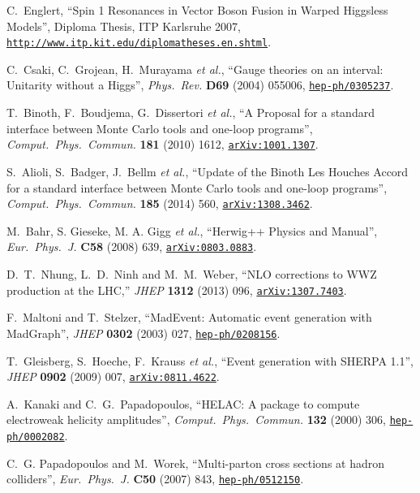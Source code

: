 \documentclass[english,12pt]{article}
\begin{document}
\begin{thebibliography}{10}
C.~Englert, ``Spin 1 Resonances in Vector Boson Fusion in Warped Higgsless
  Models'', {Diploma Thesis, ITP Karlsruhe 2007}, {\href{http://www.itp.kit.edu/diplomatheses.en.shtml}{\tt http://www.itp.kit.edu/diplomatheses.en.shtml}}.

C.~Csaki, C.~Grojean, H.~Murayama {\it et al.}, ``{Gauge theories
  on an interval: Unitarity without a Higgs}'', {\em Phys.\ Rev.} {\bf D69}
  (2004) 055006,
\href{http://www.arXiv.org/abs/hep-ph/0305237}{{\tt hep-ph/0305237}}.

  T.~Binoth, F.~Boudjema, G.~Dissertori {\it et al.},
  ``{A Proposal for a standard interface between Monte Carlo tools and one-loop programs}'',
  {\em Comput.\ Phys.\ Commun.}  {\bf 181} (2010) 1612,
  \href{http://arxiv.org/abs/1001.1307}{{\tt arXiv:1001.1307}}.

  S.~Alioli, S.~Badger, J.~Bellm {\it et al.},
  ``{Update of the Binoth Les Houches Accord for a standard interface between Monte Carlo tools and one-loop programs}'',
  {\em Comput.\ Phys.\ Commun.}  {\bf 185} (2014) 560,
  \href{http://arxiv.org/abs/1308.3462}{{\tt arXiv:1308.3462}}.

M.~Bahr, S. Gieseke, M. A. Gigg {\it et al.}, ``{Herwig++ Physics and Manual}'', {\em Eur.\ Phys.\ J.} 
{\bf C58} (2008) 639, 
\href{http://www.arXiv.org/abs/0803.0883}{{\tt arXiv:0803.0883}}.

  D.~T.~Nhung, L.~D.~Ninh and M.~M.~Weber,
  ``NLO corrections to WWZ production at the LHC,''
  {\em JHEP } {\bf 1312} (2013) 096,
\href{http://www.arXiv.org/abs/1307.7403}{{\tt arXiv:1307.7403}}.

F.~Maltoni and T.~Stelzer, ``{MadEvent: Automatic event generation with
  MadGraph}'', {\em JHEP} {\bf 0302} (2003) 027,
\href{http://www.arXiv.org/abs/hep-ph/0208156}{{\tt hep-ph/0208156}}.

  T.~Gleisberg, S.~Hoeche, F.~Krauss {\it et al.},
  ``{Event generation with SHERPA 1.1}'',
  {\em JHEP} {\bf 0902} (2009)  007,
\href{http://www.arXiv.org/abs/0811.4622}{{\tt arXiv:0811.4622}}.

A.~Kanaki and C.~G.~Papadopoulos, 
``{HELAC: A package to compute electroweak helicity amplitudes}'',
{\em Comput.\ Phys.\ Commun.} {\bf 132} (2000) 306,
\href{http://www.arXiv.org/abs/hep-ph/0002082}{{\tt hep-ph/0002082}}.

C.~G. Papadopoulos and M.~Worek, ``{Multi-parton cross sections at hadron
  colliders}'', {\em Eur.\ Phys.\ J.} {\bf C50} (2007) 843,
\href{http://www.arXiv.org/abs/hep-ph/0512150}{{\tt hep-ph/0512150}}.


\end{thebibliography}
\end{document}
